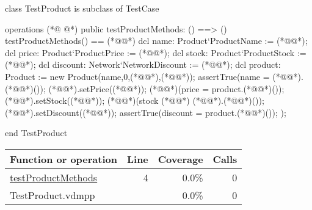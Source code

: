 \begin{vdmpp}[breaklines=true]
class TestProduct is subclass of TestCase

operations
(*@
\label{testProductMethods:4}
@*)
 public testProductMethods: () ==> ()
 testProductMethods() == (*@\vdmnotcovered{(}@*)
  dcl name: Product`ProductName := (*@@*);
  dcl price: Product`ProductPrice := (*@@*);
  dcl stock: Product`ProductStock := (*@@*);
  dcl discount: Network`NetworkDiscount := (*@@*);
  dcl product: Product := new Product(name,0,(*@@*),(*@@*));
  assertTrue(name = (*@@*).(*@@*)());
  (*@@*).setPrice((*@@*));
  (*@@*)(price = product.(*@@*)());
  (*@@*).setStock((*@@*));
  (*@@*)(stock (*@\vdmnotcovered{=}@*) (*@@*).(*@@*)());
  (*@@*).setDiscount((*@@*));
  assertTrue(discount = product.(*@@*)());
 );

end TestProduct
\end{vdmpp}
\bigskip
\begin{longtable}{|l|r|r|r|}
\hline
Function or operation & Line & Coverage & Calls \\
\hline
\hline
\hyperref[testProductMethods:4]{testProductMethods} & 4&0.0\% & 0 \\
\hline
\hline
TestProduct.vdmpp & & 0.0\% & 0 \\
\hline
\end{longtable}

